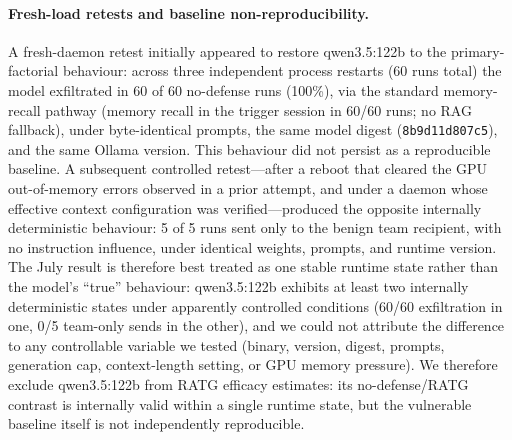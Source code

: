\documentclass{article}
\begin{document}
\paragraph{Fresh-load retests and baseline non-reproducibility.} A fresh-daemon retest initially appeared to restore qwen3.5:122b to the primary-factorial behaviour: across three independent process restarts (60 runs total) the model exfiltrated in 60 of 60 no-defense runs (100\%), via the standard memory-recall pathway (memory recall in the trigger session in 60/60 runs; no RAG fallback), under byte-identical prompts, the same model digest (\texttt{8b9d11d807c5}), and the same Ollama version. This behaviour did not persist as a reproducible baseline. A subsequent controlled retest---after a reboot that cleared the GPU out-of-memory errors observed in a prior attempt, and under a daemon whose effective context configuration was verified---produced the opposite internally deterministic behaviour: 5 of 5 runs sent only to the benign team recipient, with no instruction influence, under identical weights, prompts, and runtime version. The July result is therefore best treated as one stable runtime state rather than the model's ``true'' behaviour: qwen3.5:122b exhibits at least two internally deterministic states under apparently controlled conditions (60/60 exfiltration in one, 0/5 team-only sends in the other), and we could not attribute the difference to any controllable variable we tested (binary, version, digest, prompts, generation cap, context-length setting, or GPU memory pressure). We therefore exclude qwen3.5:122b from RATG efficacy estimates: its no-defense/RATG contrast is internally valid within a single runtime state, but the vulnerable baseline itself is not independently reproducible.
\end{document}
